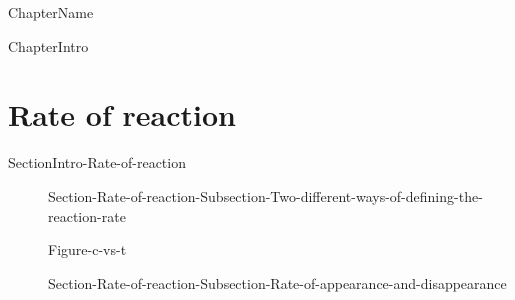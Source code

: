 \documentclass[main.tex]{subfiles}
\newcommand\chapterlabel{Ch-kinetics}\setcounter{figurenewcounter}{0}\setcounter{tablenewcounter}{0}\setcounter{formulanewcounter}{0}\chapterpicture{../{\chapterlabel}/figure1}\chapterpicturelabel{PxFuel}
\begin{document}
  
 
 \setcounter{chapter}{3}  {ChapterName}



%
  {ChapterIntro}







\section{Rate of reaction}{SectionIntro-Rate-of-reaction}
\sloppy\begin{description}
\item[] {Section-Rate-of-reaction-Subsection-Two-different-ways-of-defining-the-reaction-rate}



  {Figure-c-vs-t}
\item[] {Section-Rate-of-reaction-Subsection-Rate-of-appearance-and-disappearance}
\end{description}
\end{document}
